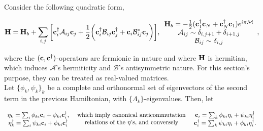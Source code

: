 \documentclass{homework}
\begin{document}
Consider the following quadratic form,

\begin{equation}
    \begin{split}
        {\bf H} = {\bf H}_b + \sum_{i,j} \bigg[{\bf c}_i^\dagger \mathcal{A}_{ij} {\bf c}_j + \frac{1}{2} \bigg({\bf c}_i^\dagger \mathcal{B}_{ij} {\bf c}_j^\dagger + {\bf c}_i \mathcal{B}_{ij}^{*} {\bf c}_j \bigg)  \bigg], \begin{array}{cc}
             {\bf H}_b = -\frac{1}{2} ({\bf c}_1^\dagger {\bf c}_N + {\bf c}_N^\dagger {\bf c}_1) e^{i \pi \mathcal{M}} \\
             \mathcal{A}_{ij} \sim \delta_{i, j+1} + \delta_{i+1, j}  \\
             \mathcal{B}_{ij} \sim \delta_{i,j}
        \end{array},
    \end{split}
    \label{XY_canonical_diag}
\end{equation}

where the $({\bf c}, {\bf c}^\dagger)$-operators are fermionic in nature and where ${\bf H}$ is hermitian, which induces $\mathcal{A}$'s hermiticity and ${\mathcal{B}}$'s antisymmetric nature. For this section's purpose, they can be treated as real-valued matrices. \\

Let $\{\phi_k, \psi_k\}_{k}$ be a complete and orthonormal set of eigenvectors of the second term in the previous Hamiltonian, with $\{\Lambda_{k}\}$-eigenvalues. Then, let 

\begin{align}
\begin{array}{c}
     \eta_{k} = \sum_{i} \phi_{ki} {\bf c}_i +  \psi_{ki} {\bf c}_i^\dagger, \\
     \eta_{k}^\dagger = \sum_{i} \psi_{ki} {\bf c}_i +  \phi_{ki} {\bf c}_i^\dagger
\end{array} \begin{array}{c}
     \textnormal{ which imply canonical anticommutation }  \\
     \textnormal{ relations of the $\eta$'s, and conversely }
\end{array} \begin{array}{c}
     {\bf c}_i = \sum_{k} \phi_{ki} {\eta}_i +  \psi_{ki} \eta_i^\dagger  \\
     {\bf c}_i^\dagger = \sum_{k} \psi_{ki} {\eta}_i +  \phi_{ki} \eta_i^\dagger.
    \label{XY_Hamiltonian_diag_ops}
\end{array}
\end{align}
\end{document}
